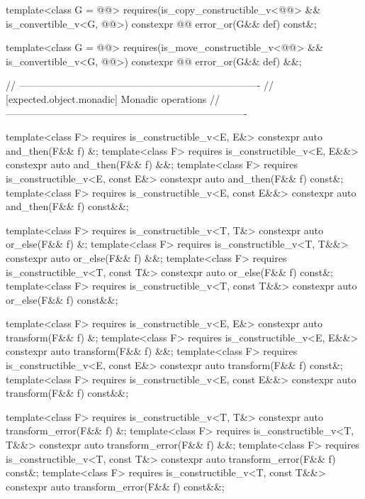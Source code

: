 \begin{codeblock}
{  template<class G = @@>
    requires(is_copy_constructible_v<@@> &&
             is_convertible_v<G, @@>)
  constexpr @@ error_or(G&& def) const&;

  template<class G = @@>
    requires(is_move_constructible_v<@@> &&
             is_convertible_v<G, @@>)
  constexpr @@ error_or(G&& def) &&;

  // -------------------------------------------------------------------------
  // [expected.object.monadic] Monadic operations
  // -------------------------------------------------------------------------

  template<class F>
    requires is_constructible_v<E, E&>
  constexpr auto and_then(F&& f) &;
  template<class F>
    requires is_constructible_v<E, E&&>
  constexpr auto and_then(F&& f) &&;
  template<class F>
    requires is_constructible_v<E, const E&>
  constexpr auto and_then(F&& f) const&;
  template<class F>
    requires is_constructible_v<E, const E&&>
  constexpr auto and_then(F&& f) const&&;

  template<class F>
    requires is_constructible_v<T, T&>
  constexpr auto or_else(F&& f) &;
  template<class F>
    requires is_constructible_v<T, T&&>
  constexpr auto or_else(F&& f) &&;
  template<class F>
    requires is_constructible_v<T, const T&>
  constexpr auto or_else(F&& f) const&;
  template<class F>
    requires is_constructible_v<T, const T&&>
  constexpr auto or_else(F&& f) const&&;

  template<class F>
    requires is_constructible_v<E, E&>
  constexpr auto transform(F&& f) &;
  template<class F>
    requires is_constructible_v<E, E&&>
  constexpr auto transform(F&& f) &&;
  template<class F>
    requires is_constructible_v<E, const E&>
  constexpr auto transform(F&& f) const&;
  template<class F>
    requires is_constructible_v<E, const E&&>
  constexpr auto transform(F&& f) const&&;

  template<class F>
    requires is_constructible_v<T, T&>
  constexpr auto transform_error(F&& f) &;
  template<class F>
    requires is_constructible_v<T, T&&>
  constexpr auto transform_error(F&& f) &&;
  template<class F>
    requires is_constructible_v<T, const T&>
  constexpr auto transform_error(F&& f) const&;
  template<class F>
    requires is_constructible_v<T, const T&&>
  constexpr auto transform_error(F&& f) const&&;

}
\end{codeblock}
